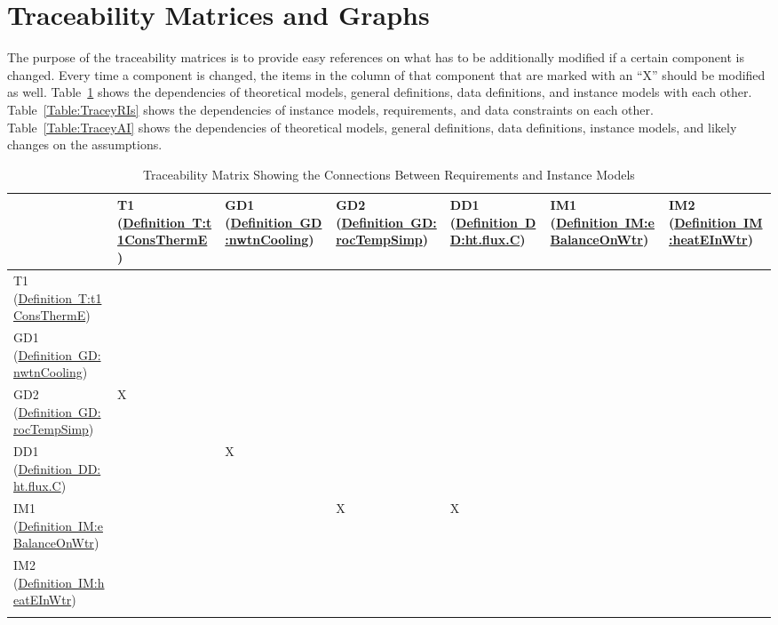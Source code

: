 \documentclass[12pt]{article}
\begin{document}
\section{Traceability Matrices and Graphs}
\label{Sec:TraceMatrices}
The purpose of the traceability matrices is to provide easy references on what has to be additionally modified if a certain component is changed. Every time a component is changed, the items in the column of that component that are marked with an ``X'' should be modified as well. Table~\ref{Table:TraceyRI} shows the dependencies of theoretical models, general definitions, data definitions, and instance models with each other. Table~\ref{Table:TraceyRIs} shows the dependencies of instance models, requirements, and data constraints on each other. Table~\ref{Table:TraceyAI} shows the dependencies of theoretical models, general definitions, data definitions, instance models, and likely changes on the assumptions.
\begin{longtable}{l l l l l l l}
\toprule
& T1 (\hyperref[T:t1ConsThermE]{Definition~T:t1ConsThermE}) & GD1 (\hyperref[GD:nwtnCooling]{Definition~GD:nwtnCooling}) & GD2 (\hyperref[GD:rocTempSimp]{Definition~GD:rocTempSimp}) & DD1 (\hyperref[DD:ht.flux.C]{Definition~DD:ht.flux.C}) & IM1 (\hyperref[IM:eBalanceOnWtr]{Definition~IM:eBalanceOnWtr}) & IM2 (\hyperref[IM:heatEInWtr]{Definition~IM:heatEInWtr})
\\
\midrule
T1 (\hyperref[T:t1ConsThermE]{Definition~T:t1ConsThermE}) &  &  &  &  &  & 
\\
GD1 (\hyperref[GD:nwtnCooling]{Definition~GD:nwtnCooling}) &  &  &  &  &  & 
\\
GD2 (\hyperref[GD:rocTempSimp]{Definition~GD:rocTempSimp}) & X &  &  &  &  &  
\\
DD1 (\hyperref[DD:ht.flux.C]{Definition~DD:ht.flux.C}) &  & X &  &  &  & 
\\
IM1 (\hyperref[IM:eBalanceOnWtr]{Definition~IM:eBalanceOnWtr}) &  &  & X & X &  &  
\\
IM2 (\hyperref[IM:heatEInWtr]{Definition~IM:heatEInWtr}) &  &  &  &  &  & 
\\
\bottomrule
\caption{Traceability Matrix Showing the Connections Between Requirements and Instance Models}
\label{Table:TraceyRI}
\end{longtable}
\end{document}

